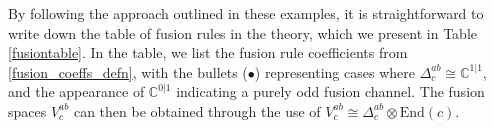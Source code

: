 \documentclass[12pt,a4paper]{article}
\newcommand{\tp}{\otimes}
\newcommand{\unit}{\mathds{1}}
\newcommand{\cc}{\mathbb{C}}
\newcommand{\mcz}{\mathcal{Z}}
\newcommand{\ethan}[1]{{\color{amethyst}\footnotesize{(EL) #1}}}
\begin{document}
By following the approach outlined in these examples, it is straightforward to write down the table of fusion rules in the theory, which we present in Table \ref{fusiontable}. In the table, we list the fusion rule coefficients from \eqref{fusion_coeffs_defn}, with the bullets ($\bullet$) representing cases where $\Delta^{ab}_c \cong \cc^{1|1}$, and the appearance of $\cc^{0|1}$ indicating a purely odd fusion channel. 
The fusion spaces $V^{ab}_c$ can then be obtained through the use of $V^{ab}_c \cong \Delta^{ab}_c \tp \text{End}(c)$. 

\end{document}
